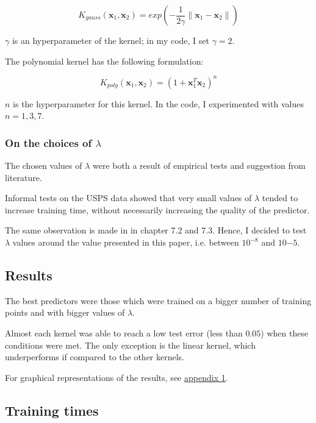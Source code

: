 \documentclass[a4paper]{article}
\begin{document}
\begin{equation}
K_{gauss} (\mathbf{x}_1, \mathbf{x}_2) = exp(-\frac{1}{2 \gamma} \parallel \mathbf{x}_1 - \mathbf{x}_2 \parallel)
\end{equation}

\(\gamma\) is an hyperparameter of the kernel; in my code, I set \(\gamma = 2\).

The polynomial kernel has the following formulation:

\begin{equation}
K_{poly} (\mathbf{x}_1, \mathbf{x}_2) = (1 + \mathbf{x}_1^T \mathbf{x}_2) ^ n
\end{equation}

\(n\) is the hyperparameter for this kernel. In the code, I experimented with values \(n = 1,3,7\).

\subsubsection{On the choices of \(\lambda\)}
\label{sec:org7c8dee4}

The chosen values of \(\lambda\) were both a result of empirical tests and suggestion from literature.

Informal tests on the USPS data showed that very small values of \(\lambda\) tended to increase training time, without necessarily increasing the quality of the predictor. 

The same observation is made in \cite{pegasos} in chapter 7.2 and 7.3. Hence, I decided to test \(\lambda\) values around the value presented in this paper, i.e. between \(10^{-8}\) and \(10{-5}\).

\subsection{Results}
\label{sec:org9e3f1ad}

The best predictors were those which were trained on a bigger number of training points and with bigger values of \(\lambda\).

Almost each kernel was able to reach a low test error (less than \(0.05\)) when these conditions were met. The only exception is the linear kernel, which underperforms if compared to the other kernels.

For graphical representations of the results, see \hyperref[org20e0d68]{appendix 1}.

\subsection{Training times}
\label{sec:orgcec4c5c}
\end{document}
